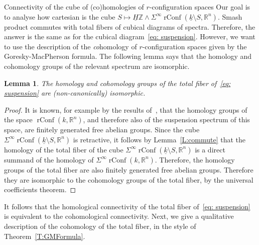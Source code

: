 \documentclass[12pt]{amsart}
\newcommand{\R}{{\mathbb R}}
\newcommand{\Z}{{\mathbb Z}}
\newcommand{\rConf}{\operatorname{rConf}}
\newcommand{\HZ}{\underline{H}\Z}
\theoremstyle{plain}
\newtheorem{lemma}[thm]{Lemma}
\theoremstyle{definition}
\theoremstyle{remark}
\begin{document}
\begin{section}{Connectivity of the cube of (co)homologies of $r$-configuration spaces}
Our goal is to analyse how cartesian is the cube $S\mapsto \HZ\wedge \Sigma^\infty \rConf(\underline{k} \setminus S, \R^n)$. Smash product commutes with total fibers of cubical diagrams of spectra. Therefore, the answer is the same as for the cubical diagram~\eqref{eq: suspension}. However, we want to use the description of the {\it co}homology of $r$-configuration spaces given by the Goresky-MacPherson formula. The following lemma says that the homology and cohomology groups of the relevant spectrum are isomorphic.
\begin{lemma}
The homology and cohomology groups of the total fiber of~\eqref{eq: suspension} are (non-canonically) isomorphic.
\end{lemma}
\begin{proof}
It is known, for example by the results of~\cite{Bjo95}, that the homology groups of the space $\rConf(k, \R^n)$, and therefore also of the suspension spectrum of this space, are finitely generated free abelian groups. Since the cube $\Sigma^\infty\rConf(\underline{k} \setminus S, \R^n)$ is retractive, it follows by Lemma~\ref{L:commute} that the homology of the total fiber of the cube $\Sigma^\infty \rConf(\underline{k} \setminus S, \R^n)$ is a direct summand of the homology of $\Sigma^\infty \rConf(k, \R^n)$. Therefore, the homology groups of the total fiber are also finitely generated free abelian groups. Therefore they are isomorphic to the cohomology groups of the total fiber, by the universal coefficients theorem.
\end{proof}
It follows that the homological connectivity of the total fiber of~\eqref{eq: suspension} is equivalent to the cohomological connectivity. Next, we give a qualitative description of the cohomology of the total fiber, in the style of Theorem~\ref{T:GMFormula}.



\end{section}
\end{document}
